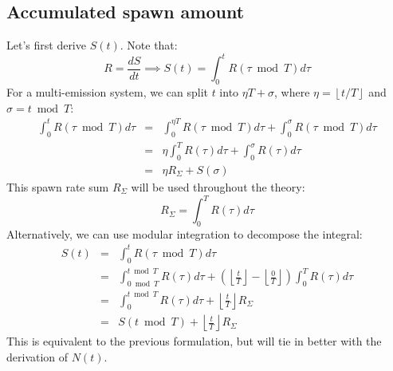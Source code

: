 \documentclass[10pt]{report}
\newcommand{\floor}[1]{\left\lfloor #1 \right\rfloor}
\begin{document}
\subsection{Accumulated spawn amount}
Let's first derive $S(t)$. Note that:
\begin{equation}R=\frac{dS}{dt}\implies S(t)=\int_0^tR(\tau\bmod T)d\tau\end{equation}
For a multi-emission system, we can split $t$ into $\eta T+\sigma$, where $\eta=\floor{t/T}$ and $\sigma=t\bmod T$:
\begin{eqnarray}
\int_0^tR(\tau\bmod T)d\tau&=&\int_0^{\eta T}R(\tau\bmod T)d\tau+\int_0^\sigma R(\tau\bmod T)d\tau\\
&=&\eta\int_0^TR(\tau)d\tau+\int_0^\sigma R(\tau)d\tau\\
&=&\eta R_{\Sigma}+S(\sigma)
\end{eqnarray}
This spawn rate sum $R_\Sigma$ will be used throughout the theory:
\begin{equation}R_\Sigma=\int_0^TR(\tau)d\tau\end{equation}
Alternatively, we can use modular integration to decompose the integral:
\begin{eqnarray}
S(t)&=&\int_0^tR(\tau\bmod T)d\tau\\
&=&\int_{0\bmod T}^{t\bmod T}R(\tau)d\tau+(\floor{\tfrac{t}{T}}-\floor{\tfrac{0}{T}})\int_0^TR(\tau)d\tau\\
&=&\int_0^{t\bmod T}R(\tau)d\tau+\floor{\tfrac{t}{T}}R_\Sigma\\
&=&S(t\bmod T)+\floor{\tfrac{t}{T}}R_\Sigma
\end{eqnarray}
This is equivalent to the previous formulation, but will tie in better with the derivation of $N(t)$.
\end{document}
